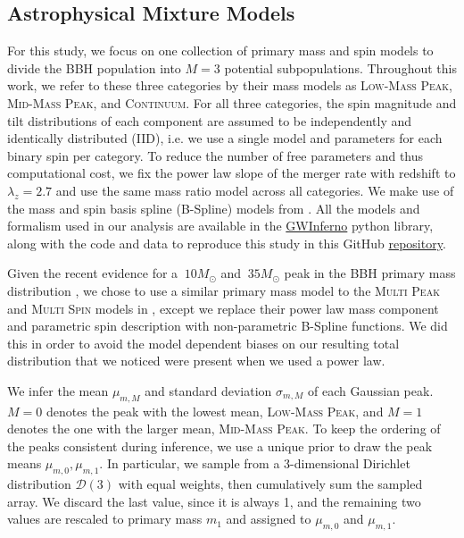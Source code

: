 \subsection{Astrophysical Mixture Models} \label{sec:astromodels}

For this study, we focus on one collection of primary mass and spin models to divide the BBH population into $M=3$ potential subpopulations. Throughout this work, we refer to these three categories by their mass models as \textsc{Low-Mass Peak}, \textsc{Mid-Mass Peak}, and \textsc{Continuum}. For all three categories, the spin magnitude and tilt distributions of each component are assumed to be independently and identically distributed (IID), i.e. we use a single model and parameters for each binary spin per category. To reduce the number of free parameters and thus computational cost, we fix the power law slope of the merger rate with redshift to $\lambda_z=2.7$ and use the same mass ratio model across all categories. We make use of the mass and spin basis spline (B-Spline) models from \cite{2022arXiv221012834E}. All the models and formalism used in our analysis are available in the \href{https://git.ligo.org/bruce.edelman/gwinferno}{GWInferno} python library, along with the code and data to reproduce this study in this GitHub \href{https://github.com/jaxeng/paper}{repository}. 

Given the recent evidence for a $~10 M_{\odot}$ and $~35 M_{\odot}$ peak in the BBH primary mass distribution \citep{2111.03634, 2022ApJ...928..155T, 10.3847/2041-8213/aa9bf6, 10.3847/1538-4357/aab34c, 10.3847/2041-8213/ab3800, 2021ApJ...913L...7A}, we chose to use a similar primary mass model to the \textsc{Multi Peak} and \textsc{Multi Spin} models in \cite{2021ApJ...913L...7A}, except we replace their power law mass component and parametric spin description with non-parametric B-Spline functions. We did this in order to avoid the model dependent biases on our resulting total distribution that we noticed were present when we used a power law.

We infer the mean $\mu_{m,M}$ and standard deviation $\sigma_{m,M}$ of each Gaussian peak. $M=0$ denotes the peak with the lowest mean, \textsc{Low-Mass Peak}, and $M=1$ denotes the one with the larger mean, \textsc{Mid-Mass Peak}. To keep the ordering of the peaks consistent during inference, we use a unique prior to draw the peak means $\mu_{m,0}, \mu_{m,1}$. In particular, we sample from a 3-dimensional Dirichlet distribution $\mathcal{D}(3)$ with equal weights, then cumulatively sum the sampled array. We discard the last value, since it is always 1, and the remaining two values are rescaled to primary mass $m_1$ and assigned to $\mu_{m,0}$ and $\mu_{m,1}$. 

